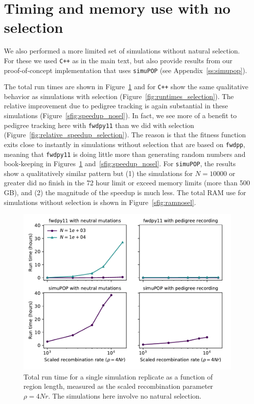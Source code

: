 \documentclass{article}
\newcommand{\simupop}{\texttt{simuPOP}}
\newcommand{\fwdpp}{\texttt{fwdpp}}
\newcommand{\fwdpy}{\texttt{fwdpy11}}
\newcommand{\cpp}{\texttt{C++}}
\begin{document}
\section{Timing and memory use with no selection}
\label{ss:timing_nosel}
\renewcommand{\thefigure}{D\arabic{figure}}
\setcounter{figure}{0}

We also performed a more limited set of simulations without natural selection.
For these we used \cpp{} as in the main text, but also provide results from our
proof-of-concept implementation that uses \simupop{} (see
Appendix~\ref{ss:simupop}).

The total run times are shown in
Figure~\ref{sfig:rawspeed_nosel} and for \cpp{} show the same qualitative behavior as simulations with selection
(Figure~\ref{fig:runtimes_selection}).  The relative improvement due to pedigree tracking is again substantial in these
simulations (Figure~\ref{sfig:speedup_nosel}).  In fact, we see more of a benefit to pedigree tracking here with \fwdpy{}
than we did with selection (Figure~\ref{fig:relative_speedup_selection}).  The reason is that the fitness function exits
close to instantly in simulations without selection that are based on \fwdpp{}, meaning that \fwdpy{} is doing little
more than generating random numbers and book-keeping in Figures~\ref{sfig:rawspeed_nosel}
and~\ref{sfig:speedup_nosel}.
For \simupop{}, the results show a qualitatively similar pattern but (1) the
simulations for $N = 10000$ or greater did no finish in the 72 hour limit or
exceed memory limits (more than 500 GB), and (2) the magnitude of the speedup is much less.
The total RAM use for
simulations without selection is shown in Figure~\ref{sfig:ramnosel}.

\begin{figure}[!h]
    \includegraphics[]{sims/rawspeed_nosel}
    \caption{\label{sfig:rawspeed_nosel}Total run time for a single simulation replicate as a function of region
        length, measured as the scaled recombination parameter $\rho = 4Nr$.  The simulations here involve no natural
    selection.}
\end{figure}
\end{document}
